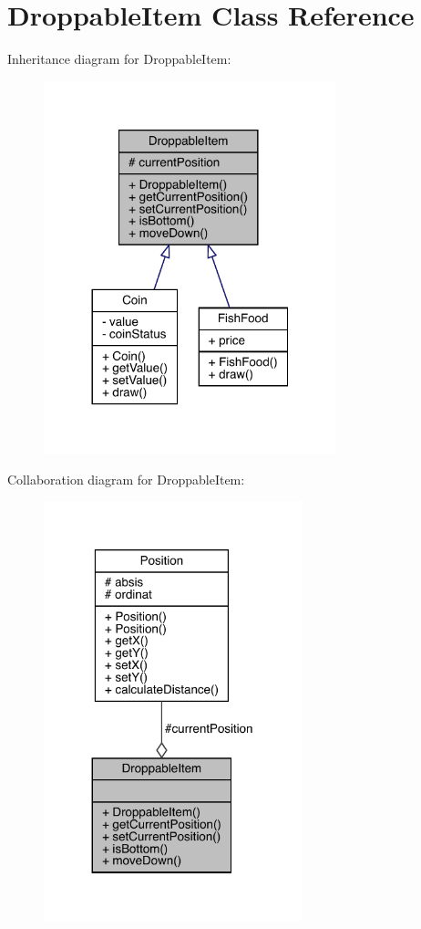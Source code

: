 \hypertarget{class_droppable_item}{}\section{Droppable\+Item Class Reference}
\label{class_droppable_item}


Inheritance diagram for Droppable\+Item\+:
\nopagebreak
\begin{figure}[H]
\begin{center}
\leavevmode
\includegraphics[width=240pt]{class_droppable_item__inherit__graph}
\end{center}
\end{figure}


Collaboration diagram for Droppable\+Item\+:
\nopagebreak
\begin{figure}[H]
\begin{center}
\leavevmode
\includegraphics[width=212pt]{class_droppable_item__coll__graph}
\end{center}
\end{figure}
